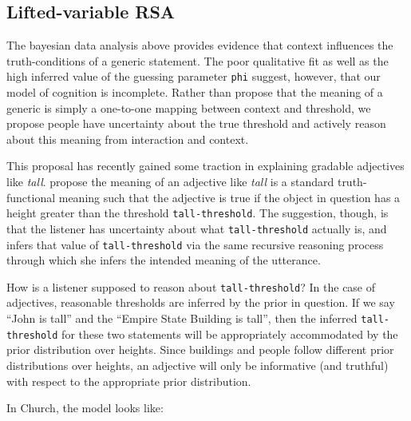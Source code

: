 \documentclass[10pt,letterpaper]{article}
\begin{document}
\subsection{Lifted-variable RSA}

The bayesian data analysis above provides evidence that context influences the truth-conditions of a generic statement. The poor qualitative fit as well as the high inferred value of the guessing parameter \lstinline{phi} suggest, however, that our model of cognition is incomplete. Rather than propose that the meaning of a generic is simply a one-to-one mapping between context and threshold, we propose people have uncertainty about the true threshold and actively reason about this meaning from interaction and context. 

This proposal has recently gained some traction in explaining gradable adjectives like \emph{tall}.   propose the meaning of an adjective like \emph{tall} is a standard truth-functional meaning such that the adjective is true if the object in question has a height greater than the threshold \lstinline{tall-threshold}. The suggestion, though, is that the listener has uncertainty about what \lstinline{tall-threshold} actually is, and infers that value of \lstinline{tall-threshold} via the same recursive reasoning process through which she infers the intended meaning of the utterance.

How is a listener supposed to reason about \lstinline{tall-threshold}? In the case of adjectives, reasonable thresholds are inferred by the prior in question. If we say ``John is tall'' and the ``Empire State Building is tall'', then the inferred \lstinline{tall-threshold} for these two statements will be appropriately accommodated by the prior distribution over heights. Since buildings and people follow different prior distributions over heights, an adjective will only be informative (and truthful) with respect to the appropriate prior distribution. 

In Church, the model looks like:
\end{document}
